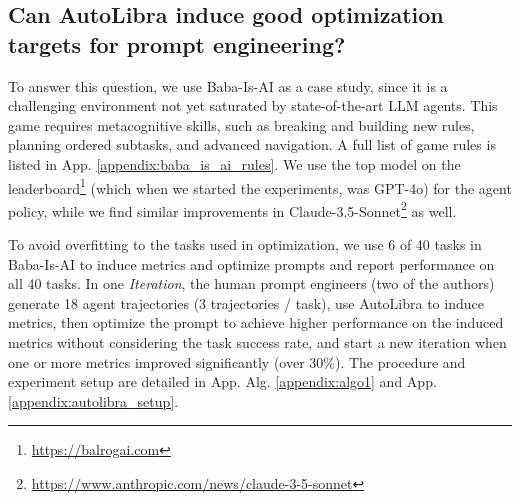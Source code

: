 \subsection{Can AutoLibra induce good optimization targets for prompt engineering?}
\label{sec:Baba-Is-AI}

To answer this question, we use Baba-Is-AI \citep{cloos2024babaaibreakrules, paglieri2024balrog} as a case study, since it is a challenging environment not yet saturated by state-of-the-art LLM agents. This game requires metacognitive skills, such as breaking and building new rules, planning ordered subtasks, and advanced navigation. A full list of game rules is listed in App. \ref{appendix:baba_is_ai_rules}.
We use the top model on the leaderboard\footnote{\url{https://balrogai.com}} (which when we started the experiments, was GPT-4o) \citep{openai2024gpt4ocard} for the agent policy, while we find similar improvements in Claude-3.5-Sonnet\footnote{\url{https://www.anthropic.com/news/claude-3-5-sonnet}} as well.



To avoid overfitting to the tasks used in optimization, we use 6 of 40 tasks in Baba-Is-AI \citep{paglieri2024balrog} to induce metrics and optimize prompts and report performance on all 40 tasks. 
In one \textit{Iteration}, the human prompt engineers (two of the authors) generate 18 agent trajectories (3 trajectories / task), use AutoLibra to induce metrics, then optimize the prompt to achieve higher performance on the induced metrics without considering the task success rate, and start a new iteration when one or more metrics improved significantly (over 30\%). The procedure and experiment setup are detailed in App. Alg. \ref{appendix:algo1} and App. \ref{appendix:autolibra_setup}.

